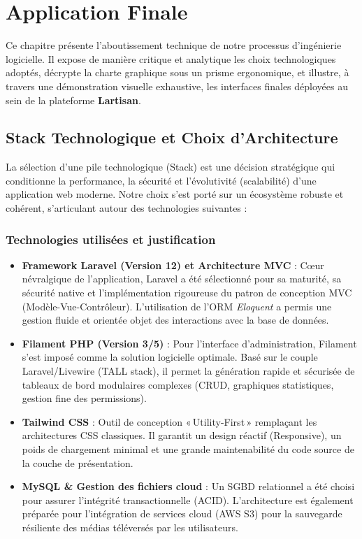 \chapter{Application Finale}
\label{ch:realisation}

Ce chapitre présente l'aboutissement technique de notre processus d'ingénierie logicielle. Il expose de manière critique et analytique les choix technologiques adoptés, décrypte la charte graphique sous un prisme ergonomique, et illustre, à travers une démonstration visuelle exhaustive, les interfaces finales déployées au sein de la plateforme \textbf{Lartisan}.

\section{Stack Technologique et Choix d'Architecture}
La sélection d'une pile technologique (Stack) est une décision stratégique qui conditionne la performance, la sécurité et l'évolutivité (scalabilité) d'une application web moderne. Notre choix s'est porté sur un écosystème robuste et cohérent, s'articulant autour des technologies suivantes :

\subsection{Technologies utilisées et justification}
\begin{itemize}
    \item \textbf{Framework Laravel (Version 12) et Architecture MVC} : Cœur névralgique de l'application, Laravel a été sélectionné pour sa maturité, sa sécurité native et l'implémentation rigoureuse du patron de conception MVC (Modèle-Vue-Contrôleur). L'utilisation de l'ORM \textit{Eloquent} a permis une gestion fluide et orientée objet des interactions avec la base de données.
    \item \textbf{Filament PHP (Version 3/5)} : Pour l'interface d'administration, Filament s'est imposé comme la solution logicielle optimale. Basé sur le couple Laravel/Livewire (TALL stack), il permet la génération rapide et sécurisée de tableaux de bord modulaires complexes (CRUD, graphiques statistiques, gestion fine des permissions).
    \item \textbf{Tailwind CSS} : Outil de conception «\,Utility-First\,» remplaçant les architectures CSS classiques. Il garantit un design réactif (Responsive), un poids de chargement minimal et une grande maintenabilité du code source de la couche de présentation.
    \item \textbf{MySQL \& Gestion des fichiers cloud} : Un SGBD relationnel a été choisi pour assurer l'intégrité transactionnelle (ACID). L'architecture est également préparée pour l'intégration de services cloud (AWS S3) pour la sauvegarde résiliente des médias téléversés par les utilisateurs.
\end{itemize}

